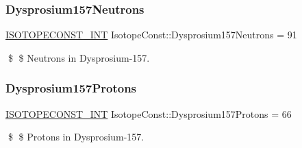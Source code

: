 \subsubsection{\texorpdfstring{Dysprosium157\+Neutrons}{Dysprosium157Neutrons}}
{\footnotesize\ttfamily \mbox{\hyperlink{group___isotope_const-_macros_ga5f18360b3e99483a35c32d789e62621c}{I\+S\+O\+T\+O\+P\+E\+C\+O\+N\+S\+T\+\_\+\+I\+NT}} Isotope\+Const\+::\+Dysprosium157\+Neutrons = 91}

\$ \$ Neutrons in Dysprosium-\/157. \mbox{\label{group___isotope_const-_dysprosium-_dy157_ga719b723a9a0836a03da0175b1d4f8cbd}} 
\subsubsection{\texorpdfstring{Dysprosium157\+Protons}{Dysprosium157Protons}}
{\footnotesize\ttfamily \mbox{\hyperlink{group___isotope_const-_macros_ga5f18360b3e99483a35c32d789e62621c}{I\+S\+O\+T\+O\+P\+E\+C\+O\+N\+S\+T\+\_\+\+I\+NT}} Isotope\+Const\+::\+Dysprosium157\+Protons = 66}

\$ \$ Protons in Dysprosium-\/157. 